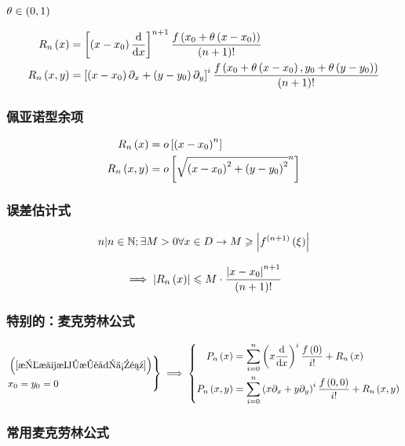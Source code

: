 \documentclass{article}
\begin{document}
$\theta\in\left(0,1\right)$

\[\begin{aligned}
        R_n\left(x\right)    & =
        \left[\left(x-x_0\right)\frac{\mathrm d}{\mathrm d x}\right]^{n+1}\frac{f\left(x_0+\theta\left(x-x_0\right)\right)}{\left(n+1\right)!} \\
        R_n\left(x,y\right) & =
        \left[\left(x-x_0\right)\partial_x+\left(y-y_0\right)\partial_y\right]^i\frac{f\left(x_0+\theta\left(x-x_0\right),y_0+\theta\left(y-y_0\right)\right)}{\left(n+1\right)!}
    \end{aligned}\]

\subsubsection{佩亚诺型余项}

\[\begin{aligned}
        R_n\left(x\right)    & =
        o\left[\left(x-x_0\right)^n\right] \\
        R_n\left(x,y\right) & =
        o\left[\sqrt{\left(x-x_0\right)^2+\left(y-y_0\right)^2}^n\right]
    \end{aligned}\]

\subsubsection{误差估计式}

\[n|n\in\mathbb N;\exists M>0\forall x\in D\to M\geqslant\left|f^{\left(n+1\right)}\left(\xi\right)\right|\]

\[\implies\left|R_n\left(x\right)\right|\leqslant M\cdot\frac{\left|x-x_0\right|^{n+1}}{\left(n+1\right)!}\]

\subsubsection{特别的：麦克劳林公式}

\[\left.\begin{aligned}
         & \left(\ref{拉格朗日型余项}\right) \\
         & x_0=y_0=0
    \end{aligned}\right\}
    \implies
    \left\{\begin{aligned}
        P_n\left(x\right)    & =\sum_{i=0}^n\left(x\frac{\mathrm d}{\mathrm d x}\right)^i\frac{f\left(0\right)}{i!}+R_n\left(x\right)                 \\
        P_n\left(x,y\right) & =\sum_{i=0}^n\left(x\partial_x+y\partial_y\right)^i\frac{f\left(0,0\right)}{i!}+R_n\left(x,y\right)
    \end{aligned}\right.\]

\subsubsection{常用麦克劳林公式}
\end{document}
